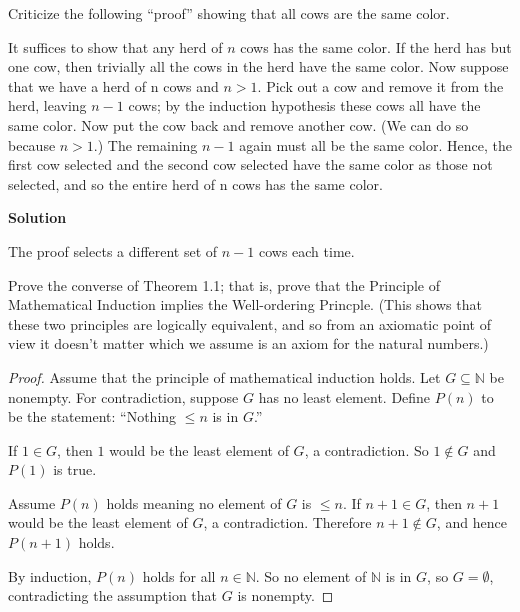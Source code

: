 \documentclass[8pt]{article}
\begin{document}
\begin{tcolorbox}[title=Problem 15, breakable]
    Criticize the following ``proof'' showing that all cows are the same
    color.

    It suffices to show that any herd of $n$ cows has the same color. If the herd
    has but one cow, then trivially all the cows in the herd have the same color.
    Now suppose that we have a herd of n cows and $n > 1$. Pick out a cow and
    remove it from the herd, leaving $n - 1$ cows; by the induction hypothesis
    these cows all have the same color. Now put the cow back and remove another
    cow. (We can do so because $n > 1$.) The remaining $n - 1$ again must all be
    the same color. Hence, the first cow selected and the second cow selected have
    the same color as those not selected, and so the entire herd of n cows has the
    same color.
\end{tcolorbox}

\textbf{Solution}

The proof selects a different set of $n - 1$ cows each time.

\begin{tcolorbox}[title=Problem 16, breakable]
    Prove the converse of Theorem 1.1; that is, prove that the Principle 
    of Mathematical Induction implies the Well-ordering Princple. 
    (This shows that these two principles are logically equivalent,
    and so from an axiomatic point of view it doesn't matter which
    we assume is an axiom for the natural numbers.)
\end{tcolorbox}

\begin{proof}
    Assume that the principle of mathematical induction holds.
    Let $G \subseteq \mathbb{N}$ be nonempty. For contradiction, suppose $G$ has no least element. 
    Define $P(n)$ to be the statement: ``Nothing $\le n$ is in $G$.''

    If $1 \in G$, then $1$ would be the least element of $G$, a contradiction. So
    $1 \notin G$ and $P(1)$ is true.

    Assume $P(n)$ holds meaning no element of $G$ is $\le n$. If $n+1 \in G$, then
    $n+1$ would be the least element of $G$, a contradiction. Therefore $n+1 \notin
        G$, and hence $P(n+1)$ holds.

    By induction, $P(n)$ holds for all $n \in \mathbb{N}$. So no element of
    $\mathbb{N}$ is in $G$, so $G = \emptyset$, contradicting the assumption that
    $G$ is nonempty. 
\end{proof}
\end{document}
